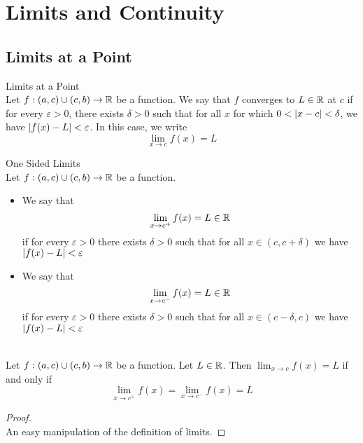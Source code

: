 \documentclass[a4paper]{article}
\begin{document}
\pagebreak
\section{Limits and Continuity}
\subsection{Limits at a Point}
\begin{defn}{Limits at a Point}{}\\ Let $f:(a,c)\cup(c,b)\to\mathbb{R}$ be a function. We say that $f$ converges to $L\in\mathbb{R}$ at $c$ if for every $\varepsilon>0$, there exists $\delta>0$ such that for all $x$ for which $0<\abs{x-c}<\delta$, we have $\abs{f(x)-L}<\varepsilon$. In this case, we write $$\lim_{x\to c}f(x)=L$$
\end{defn}

\begin{defn}{One Sided Limits}{}\\ Let $f:(a,c)\cup(c,b)\to\mathbb{R}$ be a function. 
\begin{itemize}
\item We say that $$\lim_{x\to c^+}f(x)=L\in\mathbb{R}$$ if for every $\varepsilon>0$ there exists $\delta>0$ such that for all $x\in(c,c+\delta)$ we have $\abs{f(x)-L}<\varepsilon$
\item We say that $$\lim_{x\to c^-}f(x)=L\in\mathbb{R}$$ if for every $\varepsilon>0$ there exists $\delta>0$ such that for all $x\in(c-\delta,c)$ we have $\abs{f(x)-L}<\varepsilon$
\end{itemize}
\end{defn}

\begin{lmm}{}{}\\ Let $f:(a,c)\cup(c,b)\to\mathbb{R}$ be a function. Let $L\in\mathbb{R}$. Then $\lim_{x\to c}f(x)=L$ if and only if $$\lim_{x\to c^+}f(x)=\lim_{x\to c^-}f(x)=L$$ 
\begin{proof}\\ An easy manipulation of the definition of limits. 
\end{proof}
\end{lmm}
\end{document}
